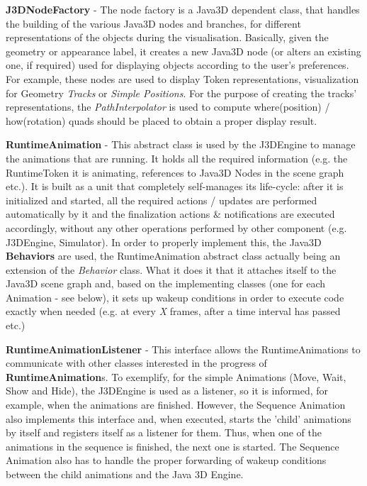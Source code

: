 \textbf{J3DNodeFactory} - The node factory is a Java3D dependent class, that handles the building of
the various Java3D nodes and branches, for different representations of the objects during the
visualisation. Basically, given the geometry or appearance label, it creates a new Java3D node (or
alters an existing one, if required) used for displaying objects according to the user's
preferences. For example, these nodes are used to display Token representations, visualization for
Geometry \textit{Tracks} or \textit{Simple Positions}. For the purpose of creating the tracks'
representations, the \textit{PathInterpolator} is used to compute where(position) / how(rotation)
quads should be placed to obtain a proper display result.

\textbf{RuntimeAnimation} - This abstract class is used by the J3DEngine to manage the animations
that are running. It holds all the required information (e.g. the RuntimeToken it is animating,
references to Java3D Nodes in the scene graph etc.). It is built as a unit that completely
self-manages its life-cycle: after it is initialized and started, all the required actions / updates
are performed automatically by it and the finalization actions \& notifications are executed
accordingly, without any other operations performed by other component (e.g. J3DEngine, Simulator).
In order to properly implement this, the Java3D \textbf{Behaviors} are used, the RuntimeAnimation
abstract class actually being an extension of the \textit{Behavior} class. What it does it that it
attaches itself to the Java3D scene graph and, based on the implementing classes (one for each
Animation - see below), it sets up wakeup conditions in order to execute code exactly when needed
(e.g. at every \textit{X} frames, after a time interval has passed etc.)

\textbf{RuntimeAnimationListener} - This interface allows the RuntimeAnimations to communicate with
other classes interested in the progress of \textbf{RuntimeAnimation}s. To exemplify, for the simple
Animations (Move, Wait, Show and Hide), the J3DEngine is used as a listener, so it is informed, for
example, when the animations are finished. However, the Sequence Animation also implements this
interface and, when executed, starts the 'child' animations by itself and registers itself as a
listener for them. Thus, when one of the animations in the sequence is finished, the next one is
started. The Sequence Animation also has to handle the proper forwarding of wakeup conditions
between the child animations and the Java 3D Engine.

